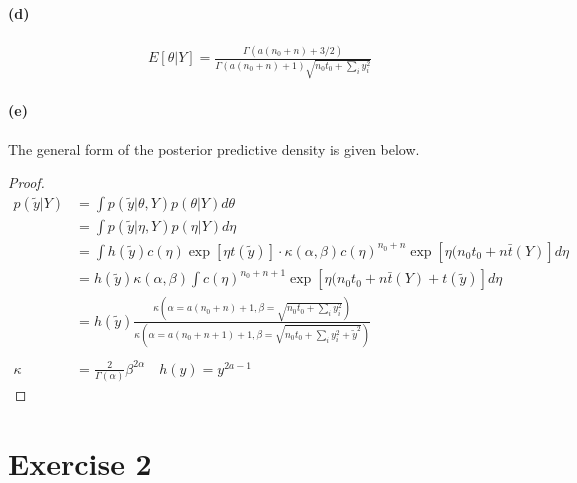 \documentclass[11pt, letterpaper]{article}
\begin{document}
\paragraph{(d)}
\begin{align*}
    E[\theta|Y] = \frac{\Gamma(a(n_0+n)+3/2)}{\Gamma(a(n_0+n)+1) \sqrt{n_0t_0 + \sum_i y_i^2}}
\end{align*}

\paragraph{(e)}
The general form of the posterior predictive density is given below.
\begin{proof}
\begin{align*}
    p(\tilde{y}|Y) &= \int p(\tilde{y}|\theta, Y) p(\theta|Y) d\theta \\
        &= \int p(\tilde{y}|\eta, Y) p(\eta|Y) d\eta \\
        &= \int h(\tilde{y})c(\eta)\exp[\eta t(\tilde{y})] \cdot \kappa(\alpha, \beta)c(\eta)^{n_0+n} \exp[\eta(n_0t_0+n\bar{t}(Y)] d\eta \\
        &= h(\tilde{y}) \kappa(\alpha, \beta) \int c(\eta)^{n_0+n+1} \exp[\eta(n_0t_0+n\bar{t}(Y)+t(\tilde{y})] d\eta \\
        &= h(\tilde{y}) 
            \frac{\kappa(\alpha=a(n_0+n)+1, \beta=\sqrt{n_0t_0 + \sum_i y_i^2})}
                 {\kappa(\alpha=a(n_0+n+1)+1, \beta=\sqrt{n_0t_0 + \sum_i y_i^2 + \tilde{y}^2})} \\ \\
    \kappa &= \frac{2}{\Gamma(\alpha)} \beta^{2\alpha} \quad h(y) = y^{2a-1}
\end{align*}
\end{proof}
\newpage

\section{Exercise 2}
\end{document}
